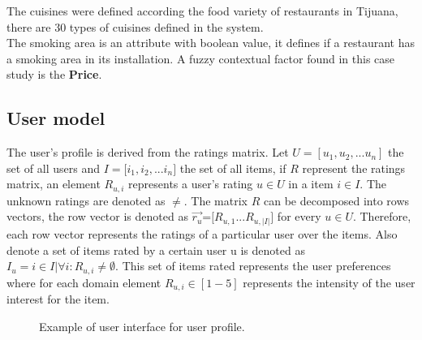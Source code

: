 The cuisines were defined according the food variety of restaurants in
Tijuana, there are 30 types of cuisines defined in the system. \\
The smoking area is an attribute with boolean value, it
defines if a restaurant has a smoking area in its installation.
A fuzzy contextual factor found in this case study is the \textbf{Price}.

\subsection{User model} 
The user's profile is derived from the ratings matrix. Let $U=[u_1,u_2,...u_n]$
the set of all users and $ I=[i_1,i_2,$...$i_n] $ the set of all items, if $R$
represent the ratings matrix,  an element  $R_{u,i}$ represents a user’s rating
$u \in U$  in a item $i \in I$.  The unknown ratings are denoted as $\neq $. The
matrix $R$ can be decomposed into rows vectors, the row vector is denoted as $
\overrightarrow{r_u} $=$[R_{u,1}$...$R_{u,|I|}]$ for every $u \in U$. Therefore,
each row vector represents the ratings of a particular user over the items. Also
denote a set of items rated by a certain user u is denoted as $ I_u = i \in I |
\forall  i: R_{u,i} \neq \emptyset $. This set of items rated represents the
user preferences where for each domain element $R_{u,i} \in [1-5]$ represents
the intensity of the user interest for  the item.\\  
\begin{figure}
\captionsetup{justification=centering,margin=2cm,font=footnotesize}
\centering
\setlength\fboxsep{0pt}
\caption{Example of user interface for user profile.}
\label{fig:user-profile}      
\end{figure}


